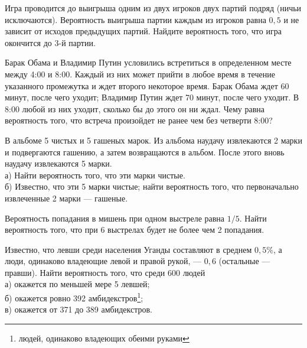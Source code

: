 \newpage\setcounter{zad}{0}



\begin{zkrW}{20}\noindent 
	Игра проводится до выигрыша одним из двух игроков двух партий подряд (ничьи исключаются). Вероятность выигрыша партии каждым из игроков равна $0{,}5$ и не зависит от исходов предыдущих партий. Найдите вероятность того, что игра окончится до 3-й партии.
 
\end{zkrW}

\begin{zkrW}{20}\noindent 
	Барак Обама и Владимир Путин условились встретиться в определенном месте между 4:00 и 8:00. Каждый из них может прийти в любое время в течение указанного промежутка и ждет второго некоторое время. Барак Обама ждет 60 минут, после чего уходит; Владимир Путин ждет 70 минут, после чего уходит. В 8:00 любой из них уходит, сколько бы до этого он ни ждал. Чему равна вероятность того, что встреча произойдет не ранее чем без четверти 8:00?
 
\end{zkrW}

\begin{zkrW}{20}\noindent 
	В альбоме 5 чистых и 5 гашеных марок. Из альбома наудачу извлекаются 2 марки и подвергаются гашению, а затем возвращаются в альбом. После этого вновь наудачу извлекаются 5 марки. \\ \indent а) Найти вероятность того, что эти марки чистые. \\ \indent б) Известно, что эти 5 марки чистые; найти вероятность того, что первоначально извлеченные 2 марки --- гашеные.
 
\end{zkrW}

\begin{zkrW}{20}\noindent 
	Вероятность попадания в мишень при одном выстреле равна $1/5$. Найти вероятность того, что при 6 выстрелах будет не более чем 2 попадания.
 
\end{zkrW}

\begin{zkrW}{20}\noindent 
	Известно, что левши среди населения Уганды составляют в среднем $0{,}5\%$, а люди, одинаково владеющие левой и правой рукой, --- $0{,}6$ (остальные --- правши). Найти вероятность того, что среди 600 людей \\ \indent а) окажется по меньшей мере 5 левшей; \\ \indent б) окажется ровно 392 амбидекстров\footnote{людей, одинаково владеющих обеими руками}; \\ \indent в) окажется от 371 до 389 амбидекстров.
 
\end{zkrW}

